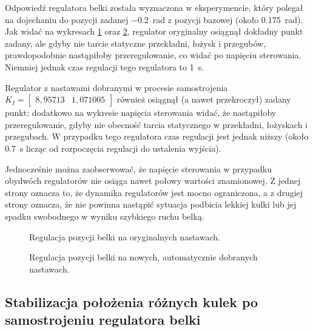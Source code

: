 Odpowiedź regulatora belki została wyznaczona w eksperymencie, który polegał na dojechaniu do pozycji zadanej \SI{-0.2}{\radian} z pozycji bazowej (około \SI{0.175}{\radian}). Jak widać na wykresach \cref{fig:stabilizacja_belki_oryg} oraz \cref{fig:stabilizacja_belki_nastrojone}, regulator oryginalny osiągnął dokładny punkt zadany, ale gdyby nie tarcie statyczne przekładni, łożysk i przegubów, prawdopodobnie nastąpiłoby przeregulowanie, co widać po napięciu sterowania. Niemniej jednak czas regulacji tego regulatora to \SI{1}{\second}.

Regulator z nastawami dobranymi w procesie samostrojenia $K_I=\begin{bmatrix}
8,95713 & 1,071005
\end{bmatrix}$ również osiągnął (a nawet przekroczył) zadany punkt; dodatkowo na wykresie napięcia sterowania widać, że nastąpiłoby przeregulowanie, gdyby nie obecność tarcia statycznego w przekładni, łożyskach i przegubach. W przypadku tego regulatora czas regulacji jest jednak niższy (około \SI{0.7}{\second} licząc od rozpoczęcia regulacji do ustalenia wyjścia).

Jednocześnie można zaobserwować, że napięcie sterowania w przypadku obydwóch regulatorów nie osiąga nawet połowy wartości znamionowej. Z jednej strony oznacza to, że dynamika regulatorów jest mocno ograniczona, a z drugiej strony oznacza, że nie powinna nastąpić sytuacja podbicia lekkiej kulki lub jej spadku swobodnego w wyniku szybkiego ruchu belką.

\begin{figure}[p]
    
    \caption{Regulacja pozycji belki na oryginalnych nastawach.}
    \label{fig:stabilizacja_belki_oryg}
\end{figure}
\begin{figure}[p]
    
    \caption{Regulacja pozycji belki na nowych, automatycznie dobranych nastawach.}
    \label{fig:stabilizacja_belki_nastrojone}
\end{figure}

\subsection{Stabilizacja położenia różnych kulek po samostrojeniu regulatora belki}
\label{subsec:ch9_stabilizacja_polozenia_roznych_kulek_po_samostrojeniu}

